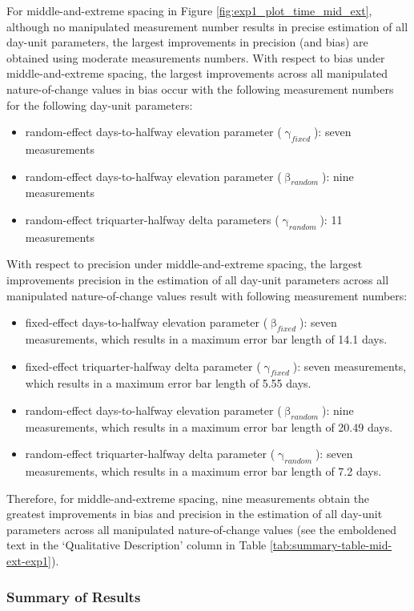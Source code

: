 \documentclass[
12pt, %
twoside,
english]{guelphthesis}
\theoremstyle{definition}
\theoremstyle{definition}
\theoremstyle{definition}
\theoremstyle{definition}
\theoremstyle{remark}
\begin{document}
For middle-and-extreme spacing in Figure \ref{fig:exp1_plot_time_mid_ext}, although no manipulated measurement number results in precise estimation of all day-unit parameters, the largest improvements in precision (and bias) are obtained using moderate measurements numbers. With respect to bias under middle-and-extreme spacing, the largest improvements across all manipulated nature-of-change values in bias occur with the following measurement numbers for the following day-unit parameters:
\begin{itemize}
\tightlist
\item
  random-effect days-to-halfway elevation parameter (\(\upgamma_{fixed}\)): seven measurements
\item
  random-effect days-to-halfway elevation parameter (\(\upbeta_{random}\)): nine measurements
\item
  random-effect triquarter-halfway delta parameters (\(\upgamma_{random}\)): 11 measurements
\end{itemize}
\noindent With respect to precision under middle-and-extreme spacing, the largest improvements precision in the estimation of all day-unit parameters across all manipulated nature-of-change values result with following measurement numbers:
\begin{itemize}
\tightlist
\item
  fixed-effect days-to-halfway elevation parameter (\(\upbeta_{fixed}\)): seven measurements, which results in a maximum error bar length of 14.1 days.
\item
  fixed-effect triquarter-halfway delta parameter (\(\upgamma_{fixed}\)): seven measurements, which results in a maximum error bar length of 5.55 days.
\item
  random-effect days-to-halfway elevation parameter (\(\upbeta_{random}\)): nine measurements, which results in a maximum error bar length of 20.49 days.
\item
  random-effect triquarter-halfway delta parameter (\(\upgamma_{random}\)): seven measurements, which results in a maximum error bar length of 7.2 days.
\end{itemize}
\noindent Therefore, for middle-and-extreme spacing, nine measurements obtain the greatest improvements in bias and precision in the estimation of all day-unit parameters across all manipulated nature-of-change values (see the emboldened text in the `Qualitative Description' column in Table \ref{tab:summary-table-mid-ext-exp1}).

\hypertarget{summary-of-results-3}{%
\subsubsection{Summary of Results}\label{summary-of-results-3}}
\end{document}
